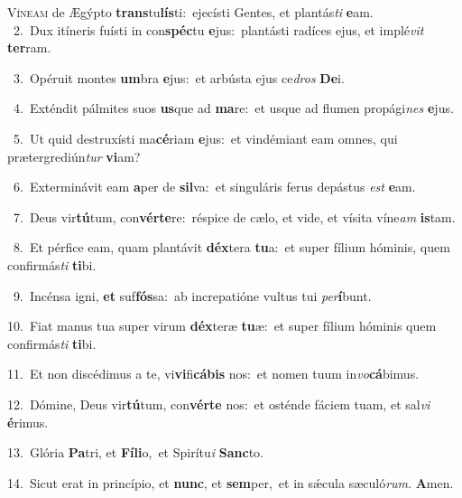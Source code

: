\lettrine{\initial\textcolor{\initialcolor}{V}}{íneam} de Ægýpto \textbf{trans}\-tu\-\textbf{lís}\-ti:~\star ejecísti Gentes, et plantás\textit{ti} \textbf{e}\-am.\\
{\numbfont\textcolor{\numbcolor}{~2.}}~Dux itíneris fuísti in con\-\textbf{spéc}\-tu \textbf{e}\-jus:~\star plantásti radíces ejus, et implé\textit{vit} \textbf{ter}\-ram.\par
{\numbfont\textcolor{\numbcolor}{~3.}}~Opéruit montes \textbf{um}\-bra \textbf{e}\-jus:~\star et arbústa ejus ce\textit{dros} \textbf{De}\-i.\par
{\numbfont\textcolor{\numbcolor}{~4.}}~Exténdit pálmites suos \textbf{us}\-que ad \textbf{ma}\-re:~\star et usque ad flumen propági\textit{nes} \textbf{e}\-jus.\par
{\numbfont\textcolor{\numbcolor}{~5.}}~Ut quid destruxísti ma\-\textbf{cé}\-riam \textbf{e}\-jus:~\star et vindémiant eam omnes, qui prætergrediún\textit{tur} \textbf{vi}\-am?\par
{\numbfont\textcolor{\numbcolor}{~6.}}~Exterminávit eam \textbf{a}\-per de \textbf{sil}\-va:~\star et singuláris ferus depástus \textit{est} \textbf{e}\-am.\par
{\numbfont\textcolor{\numbcolor}{~7.}}~Deus vir\-\textbf{tú}\-tum, con\-\textbf{vér}\-\textbf{te}re:~\star réspice de cælo, et vide, et vísita víne\textit{am} \textbf{is}\-tam.\par
{\numbfont\textcolor{\numbcolor}{~8.}}~Et pérfice eam, quam plantávit \textbf{déx}\-tera \textbf{tu}\-a:~\star et super fílium hóminis, quem confirmás\textit{ti} \textbf{ti}\-bi.\par
{\numbfont\textcolor{\numbcolor}{~9.}}~Incénsa igni, \textbf{et} suf\-\textbf{fós}\-sa:~\star ab increpatióne vultus tui \textit{per}\-\textbf{í}bunt.\par
{\numbfont\textcolor{\numbcolor}{10.}}~Fiat manus tua super virum \textbf{déx}\-teræ \textbf{tu}\-æ:~\star et super fílium hóminis quem confirmás\textit{ti} \textbf{ti}\-bi.\par
{\numbfont\textcolor{\numbcolor}{11.}}~Et non discédimus a te, vi\-\textbf{vi}\-fi\-\textbf{cá}\-\textbf{bis} nos:~\star et nomen tuum in\-\textit{vo}\-\textbf{cá}bimus.\par
{\numbfont\textcolor{\numbcolor}{12.}}~Dómine, Deus vir\-\textbf{tú}\-tum, con\-\textbf{vér}\-\textbf{te} nos:~\star et osténde fáciem tuam, et sal\textit{vi} \textbf{é}\-rimus.\par
{\numbfont\textcolor{\numbcolor}{13.}}~Glória \textbf{Pa}\-tri, et \textbf{Fí}\-\textbf{li}o,~\star et Spirítu\textit{i} \textbf{Sanc}\-to.\par
{\numbfont\textcolor{\numbcolor}{14.}}~Sicut erat in princípio, et \textbf{nunc}\-, et \textbf{sem}\-per,~\star et in sǽcula sæculó\-\textit{rum}\-. \textbf{A}\-men.\par
